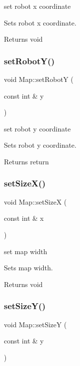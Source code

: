 set robot x coordinate 

Sets robot x coordinate.

\begin{DoxyReturn}{Returns}
void 
\end{DoxyReturn}
\mbox{\label{classMap_a2bec12995e364fc691c98b9353ae29c8}} 
\subsubsection{\texorpdfstring{set\+Robot\+Y()}{setRobotY()}}
{\footnotesize\ttfamily void Map\+::set\+RobotY (\begin{DoxyParamCaption}\item[{const int \&}]{y }\end{DoxyParamCaption})}



set robot y coordinate 

Sets robot y coordinate.

\begin{DoxyReturn}{Returns}
return 
\end{DoxyReturn}
\mbox{\label{classMap_a30b60d97e3738f517c4c50241798a4f5}} 
\subsubsection{\texorpdfstring{set\+Size\+X()}{setSizeX()}}
{\footnotesize\ttfamily void Map\+::set\+SizeX (\begin{DoxyParamCaption}\item[{const int \&}]{x }\end{DoxyParamCaption})}



set map width 

Sets map width.

\begin{DoxyReturn}{Returns}
void 
\end{DoxyReturn}
\mbox{\label{classMap_a3dfcc361c0ed20779beaedbe15aea191}} 
\subsubsection{\texorpdfstring{set\+Size\+Y()}{setSizeY()}}
{\footnotesize\ttfamily void Map\+::set\+SizeY (\begin{DoxyParamCaption}\item[{const int \&}]{y }\end{DoxyParamCaption})}



